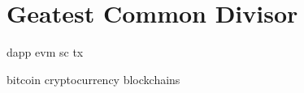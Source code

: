 \chapter{Geatest Common Divisor}

\acrlong{dapp}
\acrfull{evm}
\acrfull{sc}
\acrlong{tx}

\Gls{bitcoin}
\Gls{cryptocurrency}
\Glspl{blockchain}
